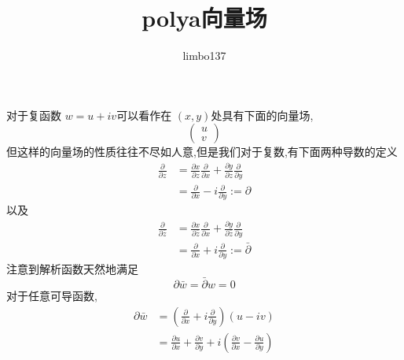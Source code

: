 \documentclass[hyperref,UTF8]{ctexart}
\title{polya向量场}
\author{limbo137}
\begin{document}
对于复函数 $w=u+iv$可以看作在 $(x,y)$处具有下面的向量场,
\[\begin{pmatrix}
    u\\v
\end{pmatrix}\]  
但这样的向量场的性质往往不尽如人意,但是我们对于复数,有下面两种导数的定义
\[\begin{aligned}
    \frac{\partial}{\partial z} &=\frac{\partial x}{\partial z} \frac{\partial}{\partial x}+\frac{\partial y}{\partial z} \frac{\partial}{\partial y} \\
    &=\frac{\partial}{\partial x}-i \frac{\partial}{\partial y}:=\partial
    \end{aligned}
\]
以及
\[\begin{aligned}
    \frac{\partial}{\partial \bar{z}} &=\frac{\partial x}{\partial \bar{z}} \frac{\partial}{\partial x}+\frac{\partial y}{\partial \bar{z}} \frac{\partial}{\partial y} \\
    &=\frac{\partial}{\partial x}+i \frac{\partial}{\partial y}:=\bar{\partial}
    \end{aligned}\]
注意到解析函数天然地满足
\[\partial \bar{w}=\bar{\partial} w=0\]
对于任意可导函数,
\[\begin{aligned}
    \partial \bar{w} &=\left(\frac{\partial}{\partial x}+i \frac{\partial}{\partial y}\right)(u-i v) \\
    &=\frac{\partial u}{\partial x}+\frac{\partial v}{\partial y}+i\left(\frac{\partial v}{\partial x}-\frac{\partial u}{\partial y}\right)
    \end{aligned}
\]
\end{document}
